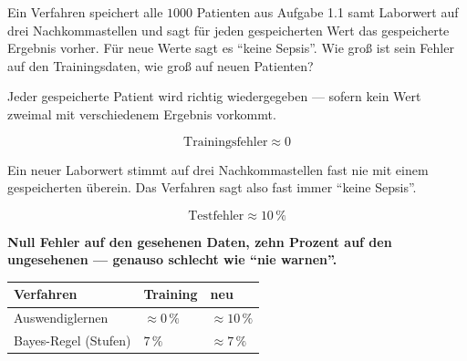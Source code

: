 \begin{aufgabe}
Ein Verfahren speichert alle $1000$ Patienten aus Aufgabe 1.1 samt Laborwert auf drei Nachkommastellen und sagt für jeden gespeicherten Wert das gespeicherte Ergebnis vorher. Für neue Werte sagt es \enquote{keine Sepsis}. Wie groß ist sein Fehler auf den Trainingsdaten, wie groß auf neuen Patienten?

\loesung
{}
Jeder gespeicherte Patient wird richtig wiedergegeben --- sofern kein Wert zweimal mit verschiedenem Ergebnis vorkommt.

\[ \text{Trainingsfehler} \approx 0 \]

Ein neuer Laborwert stimmt auf drei Nachkommastellen fast nie mit einem gespeicherten überein. Das Verfahren sagt also fast immer \enquote{keine Sepsis}.

\[ \text{Testfehler} \approx 10\,\% \]

\begin{center}
\begin{minipage}{0.9\textwidth}
\textbf{Null Fehler auf den gesehenen Daten, zehn Prozent auf den ungesehenen --- genauso schlecht wie \enquote{nie warnen}.}
\end{minipage}
\end{center}

\begin{center}
{\small
\renewcommand{\arraystretch}{1.5}
\begin{tabular}{@{}P{2.8cm}P{2.2cm}P{2.2cm}@{}}
\toprule
\textbf{Verfahren} & \textbf{Training} & \textbf{neu}\\
\midrule
Auswendiglernen & $\approx 0\,\%$ & $\approx 10\,\%$\\
Bayes-Regel (Stufen) & $7\,\%$ & $\approx 7\,\%$\\
\bottomrule
\end{tabular}}
\end{center}

\begin{center}
\begin{minipage}{0.88\textwidth}
\end{minipage}
\end{center}


\end{aufgabe}
